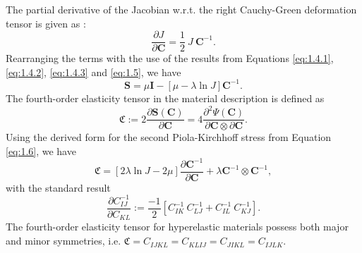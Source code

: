 \documentclass[11pt,a4paper,final]{article}
\begin{document}
The partial derivative of the Jacobian w.r.t. the right Cauchy-Green deformation tensor is given as \cite[see][page 46 Equation (3.124)]{Wriggers2008}:
\begin{equation}
\dfrac{\partial J}{\partial \mathbf{C}} = \dfrac{1}{2} \ J \ \mathbf{C}^{-1}.
\label{eq:1.5}
\end{equation}
Rearranging the terms with the use of the results from Equations \eqref{eq:1.4.1}, \eqref{eq:1.4.2}, \eqref{eq:1.4.3} and \eqref{eq:1.5}, we have
\begin{equation}
\mathbf{S} = \mu \mathbf{I} - \left[ \mu - \lambda \ln J \right] \mathbf{C}^{-1}.
\label{eq:1.6}
\end{equation}
The fourth-order elasticity tensor in the material description is defined as 
\begin{equation}
\mathfrak{C} := 2 \dfrac{\partial \mathbf{S}(\mathbf{C})}{\partial \mathbf{C}} = 4 \dfrac{\partial^2 \Psi (\mathbf{C})}{\partial \mathbf{C} \otimes \partial \mathbf{C}}.
\label{eq:1.6.2}
\end{equation}
Using the derived form for the second Piola-Kirchhoff stress from Equation \eqref{eq:1.6}, we have
\begin{equation}
\mathfrak{C} = \left[ 2 \lambda \ln J - 2 \mu \right]\dfrac{\partial \mathbf{C}^{-1}}{\partial \mathbf{C}} + \lambda \mathbf{C}^{-1} \otimes \mathbf{C}^{-1},
\end{equation}
with the standard result \cite[see][page 519]{Wriggers2008}
\begin{equation}
\dfrac{\partial C^{-1}_{IJ}}{\partial C_{KL}} := \dfrac{-1}{2} \left[ C^{-1}_{IK} \ C^{-1}_{LJ} + C^{-1}_{IL} \ C^{-1}_{KJ} \right].
\end{equation}
The fourth-order elasticity tensor for hyperelastic materials possess both major and minor symmetries, i.e. $\mathfrak{C} = C_{IJKL} = C_{KLIJ} = C_{JIKL} = C_{IJLK}$.
\end{document}

